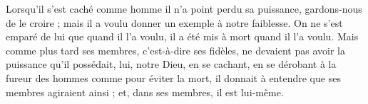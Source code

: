  Lorsqu’il s’est caché comme homme il n’a point perdu sa puissance, gardons-nous de le croire ; mais il a voulu donner un exemple à notre faiblesse. On ne s’est emparé de lui que quand il l’a voulu, il a été mis à mort quand il l’a voulu. Mais comme plus tard ses membres, c’est-à-dire ses fidèles, ne devaient pas avoir la puissance qu’il possédait, lui, notre Dieu, en se cachant, en se dérobant à la fureur des hommes comme pour éviter la mort, il donnait à entendre que ses membres agiraient ainsi ; et, dans ses membres, il est lui-même.